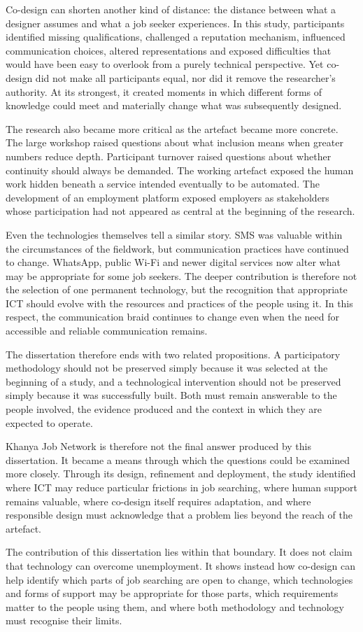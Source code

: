 Co-design can shorten another kind of distance: the distance between what a designer assumes and what a job seeker experiences. In this study, participants identified missing qualifications, challenged a reputation mechanism, influenced communication choices, altered representations and exposed difficulties that would have been easy to overlook from a purely technical perspective. Yet co-design did not make all participants equal, nor did it remove the researcher's authority. At its strongest, it created moments in which different forms of knowledge could meet and materially change what was subsequently designed.

The research also became more critical as the artefact became more concrete. The large workshop raised questions about what inclusion means when greater numbers reduce depth. Participant turnover raised questions about whether continuity should always be demanded. The working artefact exposed the human work hidden beneath a service intended eventually to be automated. The development of an employment platform exposed employers as stakeholders whose participation had not appeared as central at the beginning of the research.

Even the technologies themselves tell a similar story. SMS was valuable within the circumstances of the fieldwork, but communication practices have continued to change. WhatsApp, public Wi-Fi and newer digital services now alter what may be appropriate for some job seekers. The deeper contribution is therefore not the selection of one permanent technology, but the recognition that appropriate ICT should evolve with the resources and practices of the people using it. In this respect, the communication braid continues to change even when the need for accessible and reliable communication remains.

The dissertation therefore ends with two related propositions. A participatory methodology should not be preserved simply because it was selected at the beginning of a study, and a technological intervention should not be preserved simply because it was successfully built. Both must remain answerable to the people involved, the evidence produced and the context in which they are expected to operate.

Khanya Job Network is therefore not the final answer produced by this dissertation. It became a means through which the questions could be examined more closely. Through its design, refinement and deployment, the study identified where ICT may reduce particular frictions in job searching, where human support remains valuable, where co-design itself requires adaptation, and where responsible design must acknowledge that a problem lies beyond the reach of the artefact.

The contribution of this dissertation lies within that boundary. It does not claim that technology can overcome unemployment. It shows instead how co-design can help identify which parts of job searching are open to change, which technologies and forms of support may be appropriate for those parts, which requirements matter to the people using them, and where both methodology and technology must recognise their limits.